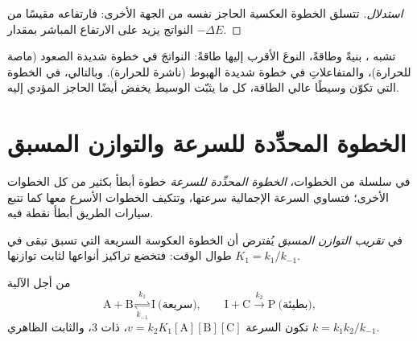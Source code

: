 \begin{proof}[استدلال]
تتسلق الخطوة العكسية الحاجز نفسه من الجهة الأخرى: فارتفاعه
مقيسًا من النواتج يزيد على الارتفاع المباشر بمقدار $-\Delta E$.
\end{proof}

\begin{proposition}\label{prop:b1:elementary-steps:hammond}
تشبه  ، بنيةً وطاقةً،
النوعَ الأقرب إليها طاقةً: النواتجَ في
خطوة شديدة الصعود (ماصة للحرارة)، والمتفاعلاتِ في خطوة شديدة
الهبوط (ناشرة للحرارة). وبالتالي، في الخطوة التي تكوّن وسيطًا عالي
الطاقة، كل ما يثبّت الوسيط يخفض أيضًا
الحاجز المؤدي إليه.
\end{proposition}
\admitted

\section{الخطوة المحدِّدة للسرعة والتوازن المسبق}

\begin{definition}\label{def:b1:elementary-steps:rds}
في سلسلة من الخطوات، \emph{الخطوة المحدِّدة
للسرعة} خطوة أبطأ بكثير من كل
الخطوات الأخرى؛ فتساوي السرعة الإجمالية سرعتها، وتتكيف الخطوات الأسرع
معها كما تتبع سيارات الطريق أبطأ نقطة فيه.
\end{definition}

\begin{definition}\label{def:b1:elementary-steps:pre-equilibrium}
في \emph{تقريب التوازن المسبق}
يُفترض أن الخطوة العكوسة السريعة التي تسبق  تبقى في  طوال الوقت: فتخضع تراكيز
أنواعها لثابت توازنها $K_1 = k_1/k_{-1}$.
\end{definition}

\begin{proposition}\label{prop:b1:elementary-steps:pre-equilibrium-law}
من أجل الآلية
\[
  \mathrm{A} + \mathrm{B} \underset{k_{-1}}{\overset{k_1}{\rightleftharpoons}} \mathrm{I}
  \ \text{(سريعة)}, \qquad
  \mathrm{I} + \mathrm{C} \xrightarrow{\ k_2\ } \mathrm{P} \ \text{(بطيئة)},
\]
تكون السرعة $v = k_2K_1[\mathrm{A}][\mathrm{B}][\mathrm{C}]$، ذات  3، والثابت الظاهري $k = k_1k_2/k_{-1}$.
\end{proposition}

